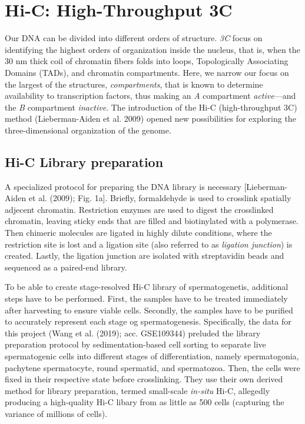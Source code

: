 \documentclass[
  11pt,
  a4paper,
]{scrbook}
\let\oldemph\emph
\renewcommand\emph[1]{\oldemph{\color{gray}#1}}
\begin{document}
\section{Hi-C: High-Throughput 3C}\label{hi-c-high-throughput-3c}

Our DNA can be divided into different orders of structure. \emph{3C}
focus on identifying the highest orders of organization inside the
nucleus, that is, when the 30 nm thick coil of chromatin fibers folds
into loops, Topologically Associating Domains (TADs), and chromatin
compartments. Here, we narrow our focus on the largest of the
structures, \emph{compartments}, that is known to determine availability
to transcription factors, thus making an \emph{A} compartment
\emph{active}---and the \emph{B} compartment \emph{inactive}. The
introduction of the Hi-C (high-throughput 3C) method (Lieberman-Aiden et
al. 2009) opened new possibilities for exploring the three-dimensional
organization of the genome.

\subsection{Hi-C Library preparation}\label{hi-c-library-preparation}

A specialized protocol for preparing the DNA library is necessary
{[}Lieberman-Aiden et al. (2009); Fig. 1a{]}. Briefly, formaldehyde is
used to crosslink spatially adjecent chromatin. Restriction enzymes are
used to digest the crosslinked chromatin, leaving sticky ends that are
filled and biotinylated with a polymerase. Then chimeric molecules are
ligated in highly dilute conditions, where the restriction site is lost
and a ligation site (also referred to as \emph{ligation junction}) is
created. Lastly, the ligation junction are isolated with streptavidin
beads and sequenced as a paired-end library.

To be able to create stage-resolved Hi-C library of spermatogenetis,
additional steps have to be performed. First, the samples have to be
treated immediately after harvesting to ensure viable cells. Secondly,
the samples have to be purified to accurately represent each stage og
spermatogenesis. Specifically, the data for this project (Wang et al.
(2019); acc. GSE109344) preluded the library preparation protocol by
sedimentation-based cell sorting to separate live spermatogenic cells
into different stages of differentiation, namely spermatogonia,
pachytene spermatocyte, round spermatid, and spermatozoa. Then, the
cells were fixed in their respective state before crosslinking. They use
their own derived method for library preparation, termed small-scale
\emph{in-situ} Hi-C, allegedly producing a high-quality Hi-C libary from
as little as 500 cells (capturing the variance of millions of cells).
\end{document}
